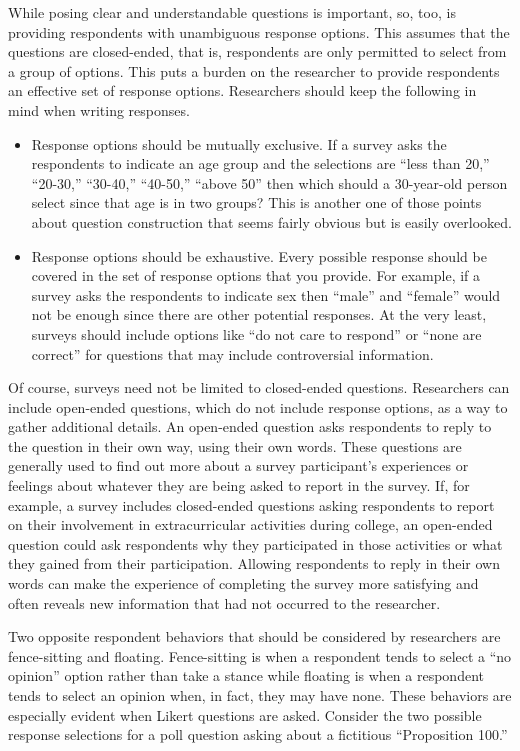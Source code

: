 While posing clear and understandable questions is important, so, too, is providing respondents with unambiguous response options. This assumes that the questions are closed-ended, that is, respondents are only permitted to select from a group of options. This puts a burden on the researcher to provide respondents an effective set of response options. Researchers should keep the following in mind when writing responses.

\begin{itemize}
	\item Response options should be mutually exclusive. If a survey asks the respondents to indicate an age group and the selections are ``less than 20,'' ``20-30,'' ``30-40,'' ``40-50,'' ``above 50'' then which should a 30-year-old person select since that age is in two groups? This is another one of those points about question construction that seems fairly obvious but is easily overlooked. 
	\item Response options should be exhaustive. Every possible response should be covered in the set of response options that you provide. For example, if a survey asks the respondents to indicate sex then ``male'' and ``female'' would not be enough since there are other potential responses. At the very least, surveys should include options like ``do not care to respond'' or ``none are correct'' for questions that may include controversial information.
\end{itemize}

Of course, surveys need not be limited to closed-ended questions. Researchers can include open-ended questions, which do not include response options, as a way to gather additional details. An open-ended question asks respondents to reply to the question in their own way, using their own words. These questions are generally used to find out more about a survey participant's experiences or feelings about whatever they are being asked to report in the survey. If, for example, a survey includes closed-ended questions asking respondents to report on their involvement in extracurricular activities during college, an open-ended question could ask respondents why they participated in those activities or what they gained from their participation. Allowing respondents to reply in their own words can make the experience of completing the survey more satisfying and often reveals new information that had not occurred to the researcher.

Two opposite respondent behaviors that should be considered by researchers are fence-sitting and floating. Fence-sitting is when a respondent tends to select a ``no opinion'' option rather than take a stance while floating is when a respondent tends to select an opinion when, in fact, they may have none. These behaviors are especially evident when Likert questions are asked. Consider the two possible response selections for a poll question asking about a fictitious ``Proposition 100.''


